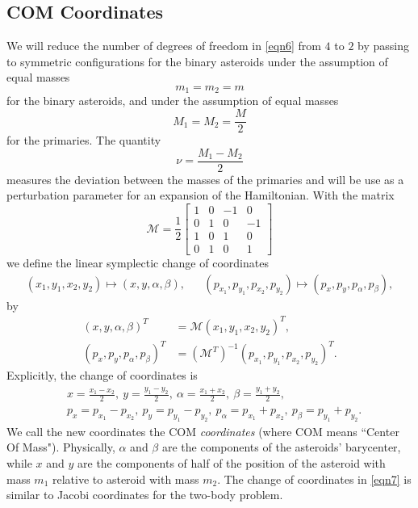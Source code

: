 \documentclass[12pt]{article}
\newcommand{\mc}{\mathcal}
\begin{document}
\subsection{COM Coordinates}\label{COMRed}
We will reduce the number of degrees of freedom in \eqref{eqn6} from $4$ to $2$ by passing to symmetric configurations for the binary asteroids under the assumption of equal masses
\[ m_1 = m_2 = m\]
for the binary asteroids, and under the assumption of equal masses
\[ M_1 = M_2 =  \frac{M}{2}\]
for the primaries. The quantity
\[ \nu = \frac{M_1 - M_2}{2}\] 
measures the deviation between the masses of the primaries and will be use as a perturbation parameter for an expansion of the Hamiltonian. With the matrix 
\begin{equation*}
    \mc{M} = \frac{1}{2}\begin{bmatrix}1 & 0 & -1 & 0\\ 0 & 1 & 0 & -1 \\ 1 & 0 & 1 & 0 \\ 0 & 1 & 0 & 1\end{bmatrix}
\end{equation*}
we define the linear symplectic change of coordinates
\begin{align*}
(x_1,y_1,x_2,y_2)  \mapsto (x,y,\alpha,\beta),  & &  (p_{x_1},p_{y_1},p_{x_2},p_{y_2})  \mapsto (p_x, p_y, p_\alpha, p_\beta),
\end{align*}
by
\begin{align*}
(x,y,\alpha,\beta)^T & = \mc{M}(x_1,y_1,x_2,y_2)^T, \\  (p_x, p_y, p_\alpha, p_\beta)^T & = (\mc{M}^T)^{-1}(p_{x_1},p_{y_1},p_{x_2},p_{y_2})^T.
\end{align*}
Explicitly, the change of coordinates is
\begin{equation} \label{eqn7}
\begin{aligned}
& x = \frac{x_1 - x_2}{2},\ y = \frac{y_1 - y_2}{2},\ \alpha = \frac{x_1 + x_2}{2},\ \beta = \frac{y_1 + y_2}{2}, \\
& p_x = p_{x_1} - p_{x_2},\ p_y = p_{y_1} - p_{y_2},\ p_\alpha = p_{x_1} + p_{x_2},\ p_\beta = p_{y_1} + p_{y_2}.
\end{aligned}
\end{equation}
We call the new coordinates the COM \textit{coordinates} (where COM means ``Center Of Mass"). Physically, $\alpha$ and $\beta$ are the components of the asteroids' barycenter, while $x$ and $y$ are the components of half of the position of the asteroid with mass $m_1$ relative to asteroid with mass $m_2$. The change of coordinates in \eqref{eqn7} is similar to Jacobi coordinates for the two-body problem.
\end{document}
